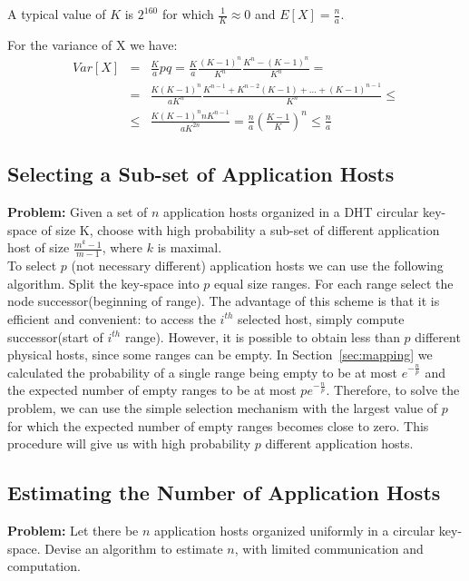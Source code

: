 \documentclass{article}
\begin{document}
A typical value of $K$ is $2^{160}$ for which $\frac{1}{K} \approx 0$
and $E[X] = \frac{n}{a}$.

For the variance of X we have:
\begin{eqnarray*}
Var[X] &=& \frac{K}{a}pq = \frac{K}{a}\frac{(K-1)^n}{K^n}\frac{K^n -
  (K-1)^n}{K^n} =\\
&=& \frac{K(K-1)^n}{aK^n}\frac{K^{n-1} + K^{n-2}(K-1) + \ldots +
  (K-1)^{n-1}}{K^n} \leq \\
&\leq& \frac{K(K-1)^nnK^{n-1}}{aK^{2n}} = \frac{n}{a}(\frac{K-1}{K})^n
  \leq \frac{n}{a}
\end{eqnarray*}


\subsection{Selecting a Sub-set of Application Hosts}
\label{sec:selecting}
{\bf Problem:} Given a set of $n$ application hosts organized in a DHT
circular key-space of size K, choose with high probability a sub-set
of different application host of size $\frac{m^k-1}{m-1}$, where $k$
is maximal.\\

 To select $p$ (not necessary different)
application  hosts we can use the following algorithm. Split the
key-space into $p$ equal size ranges. For each range select the node
successor(beginning of range). The advantage of this scheme is that it
is efficient and convenient: to access the $i^{th}$ selected host, simply
compute successor(start of $i^{th}$ range). However, it is possible to
obtain less than $p$ different physical hosts, since some ranges can
be empty. In Section~\ref{sec:mapping} we calculated the probability
of a single range being empty to be at most $e^{-\frac{n}{p}}$ and
the expected number of empty ranges to be at most
$pe^{-\frac{n}{p}}$. Therefore, to solve the problem, we can use the
simple selection mechanism with the largest value of $p$ for which the
expected number of empty ranges becomes close to zero. This procedure
will give us with high probability $p$ different application hosts.

\subsection{Estimating the Number of Application Hosts}
\label{sec:estimating}
{\bf Problem:} Let there be $n$ application hosts organized uniformly in a
circular key-space. Devise an algorithm to estimate $n$, with limited
communication and computation.
\end{document}
